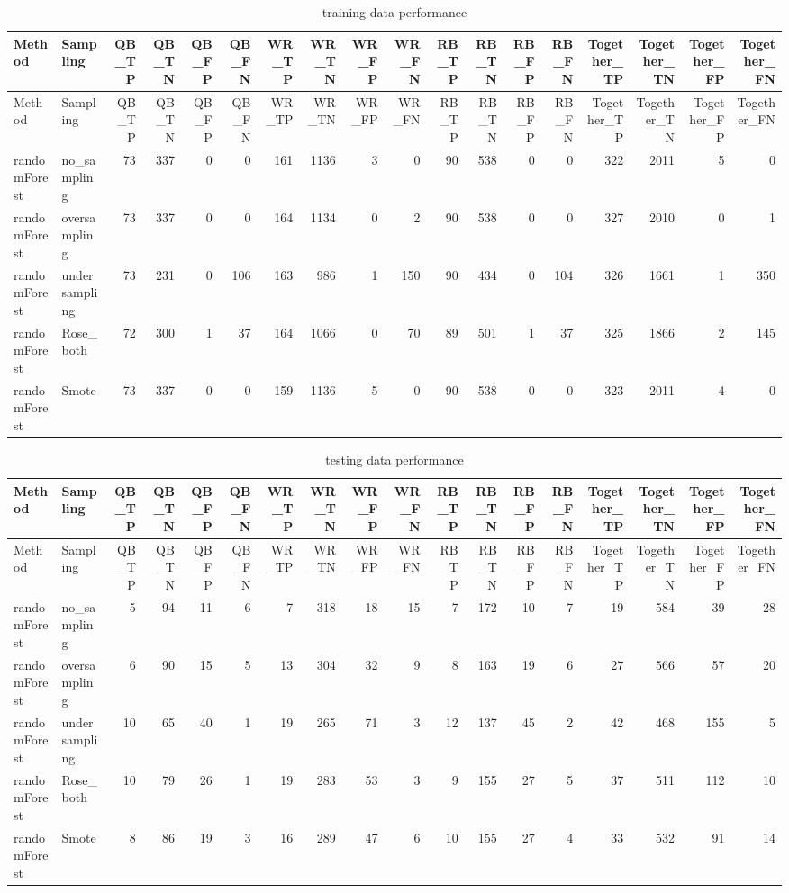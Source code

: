 \documentclass[]{article}
\begin{document}
\begin{longtable}[]{@{}llrrrrrrrrrrrrrrrr@{}}
\caption{training data performance}\tabularnewline
\toprule
Method & Sampling & QB\_TP & QB\_TN & QB\_FP & QB\_FN & WR\_TP & WR\_TN
& WR\_FP & WR\_FN & RB\_TP & RB\_TN & RB\_FP & RB\_FN & Together\_TP &
Together\_TN & Together\_FP & Together\_FN\tabularnewline
\midrule
\endfirsthead
\toprule
Method & Sampling & QB\_TP & QB\_TN & QB\_FP & QB\_FN & WR\_TP & WR\_TN
& WR\_FP & WR\_FN & RB\_TP & RB\_TN & RB\_FP & RB\_FN & Together\_TP &
Together\_TN & Together\_FP & Together\_FN\tabularnewline
\midrule
\endhead
randomForest & no\_sampling & 73 & 337 & 0 & 0 & 161 & 1136 & 3 & 0 & 90
& 538 & 0 & 0 & 322 & 2011 & 5 & 0\tabularnewline
randomForest & oversampling & 73 & 337 & 0 & 0 & 164 & 1134 & 0 & 2 & 90
& 538 & 0 & 0 & 327 & 2010 & 0 & 1\tabularnewline
randomForest & undersampling & 73 & 231 & 0 & 106 & 163 & 986 & 1 & 150
& 90 & 434 & 0 & 104 & 326 & 1661 & 1 & 350\tabularnewline
randomForest & Rose\_both & 72 & 300 & 1 & 37 & 164 & 1066 & 0 & 70 & 89
& 501 & 1 & 37 & 325 & 1866 & 2 & 145\tabularnewline
randomForest & Smote & 73 & 337 & 0 & 0 & 159 & 1136 & 5 & 0 & 90 & 538
& 0 & 0 & 323 & 2011 & 4 & 0\tabularnewline
\bottomrule
\end{longtable}

\begin{longtable}[]{@{}llrrrrrrrrrrrrrrrr@{}}
\caption{testing data performance}\tabularnewline
\toprule
Method & Sampling & QB\_TP & QB\_TN & QB\_FP & QB\_FN & WR\_TP & WR\_TN
& WR\_FP & WR\_FN & RB\_TP & RB\_TN & RB\_FP & RB\_FN & Together\_TP &
Together\_TN & Together\_FP & Together\_FN\tabularnewline
\midrule
\endfirsthead
\toprule
Method & Sampling & QB\_TP & QB\_TN & QB\_FP & QB\_FN & WR\_TP & WR\_TN
& WR\_FP & WR\_FN & RB\_TP & RB\_TN & RB\_FP & RB\_FN & Together\_TP &
Together\_TN & Together\_FP & Together\_FN\tabularnewline
\midrule
\endhead
randomForest & no\_sampling & 5 & 94 & 11 & 6 & 7 & 318 & 18 & 15 & 7 &
172 & 10 & 7 & 19 & 584 & 39 & 28\tabularnewline
randomForest & oversampling & 6 & 90 & 15 & 5 & 13 & 304 & 32 & 9 & 8 &
163 & 19 & 6 & 27 & 566 & 57 & 20\tabularnewline
randomForest & undersampling & 10 & 65 & 40 & 1 & 19 & 265 & 71 & 3 & 12
& 137 & 45 & 2 & 42 & 468 & 155 & 5\tabularnewline
randomForest & Rose\_both & 10 & 79 & 26 & 1 & 19 & 283 & 53 & 3 & 9 &
155 & 27 & 5 & 37 & 511 & 112 & 10\tabularnewline
randomForest & Smote & 8 & 86 & 19 & 3 & 16 & 289 & 47 & 6 & 10 & 155 &
27 & 4 & 33 & 532 & 91 & 14\tabularnewline
\bottomrule
\end{longtable}
\end{document}
